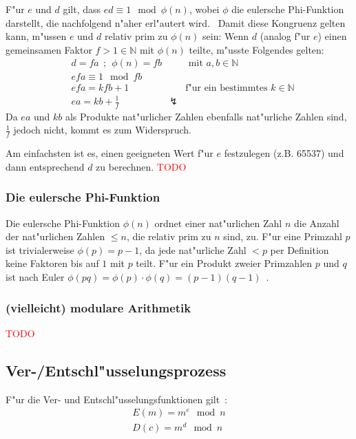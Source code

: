 \documentclass[12pt]{article}
\newcommand{\todo}[1]{\textcolor{red}{\mbox{TODO}}\marginpar{\textcolor{red}{#1}}}
\begin{document}
F"ur $e$ und $d$ gilt, dass $ed \equiv 1 \mod \phi(n)$,
wobei $\phi$ die eulersche Phi-Funktion darstellt, die nachfolgend n"aher erl"autert wird.~\cite{rsa}
Damit diese Kongruenz gelten kann, m"ussen $e$ und $d$ relativ prim zu $\phi(n)$ sein:
Wenn $d$ (analog f"ur $e$) einen gemeinsamen Faktor $f > 1 \in \mathbb{N}$ mit $\phi(n)$ teilte, m"usste Folgendes gelten:
\[
\begin{aligned}
&d = fa ~~;~~ \phi(n) = fb && \textrm{ mit } a, b \in \mathbb{N} \\
&efa \equiv 1 \mod fb \\
&efa = kfb + 1 && \textrm{f"ur ein bestimmtes } k \in \mathbb{N} \\
&ea = kb + \frac{1}{f} & \lightning &
\end{aligned}
\]
Da $ea$ und $kb$ als Produkte nat"urlicher Zahlen ebenfalls nat"urliche Zahlen sind, $\frac{1}{f}$ jedoch nicht, kommt es zum Widerspruch.

Am einfachsten ist es, einen geeigneten Wert f"ur $e$ festzulegen (z.B. 65537)
und dann entsprechend $d$ zu berechnen.
\todo{Wie kann man das berechnen?}

\subsubsection{Die eulersche Phi-Funktion}
Die eulersche Phi-Funktion $\phi(n)$ ordnet einer nat"urlichen Zahl $n$ die Anzahl der nat"urlichen Zahlen $\leq n$,
die relativ prim zu $n$ sind, zu.
F"ur eine Primzahl $p$ ist trivialerweise $\phi(p) = p-1$,
da jede nat"urliche Zahl $<p$ per Definition keine Faktoren bis auf $1$ mit $p$ teilt.
F"ur ein Produkt zweier Primzahlen $p$ und $q$ ist nach Euler
$\phi(pq) = \phi(p) \cdot \phi(q) = (p-1)(q-1)$~\cite{euler63}.

\subsubsection{(vielleicht) modulare Arithmetik}
\todo{Eher in den Anhang?}
\subsection{Ver-/Entschl"usselungsprozess}
F"ur die Ver- und Entschl"usselungsfunktionen gilt~\cite{rsa}:
\[
\begin{aligned}
E(m) = m^e \mod n \\
D(c) = m^d \mod n
\end{aligned}
\]
\end{document}
